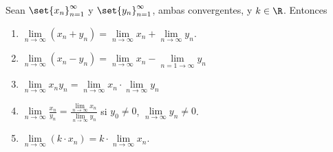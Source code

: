\begin{proposition}
	\label{proplimsuc}
	Sean \(\set{x_n}^{\infty}_{n = 1 } \) y \(\set{y_n}^{\infty}_{n = 1} \), ambas convergentes, y \(k \in \R \). Entonces
	\begin{enumerate}
		\item \(\lim\limits_{n \to \infty} (x_n + y_n) = \lim\limits_{n \to \infty} x_n + \lim\limits_{n \to \infty} y_n\).
		\item  \(\lim\limits_{n \to \infty} (x_n - y_n) = \lim\limits_{n \to \infty} x_n - \lim\limits_{n = 1 \to \infty} y_n \)
		\item \(\lim\limits_{n \to \infty} x_n y_n = \lim\limits_{n \to \infty} x_n \cdot \lim\limits_{n \to \infty} y_n \)
		\item \(\lim\limits_{n \to \infty} \frac{x_n }{y_n } = \frac{\lim\limits_{n \to \infty} x_n }{\lim\limits_{n \to \infty} y_n}\) si \(y_0 \neq 0 \), \(\lim\limits_{n \to \infty} y_n \neq 0 \).
		\item \(\lim\limits_{n \to \infty} (k \cdot x_n) = k \cdot \lim\limits_{n \to \infty} x_n \).
	\end{enumerate}
\end{proposition}
